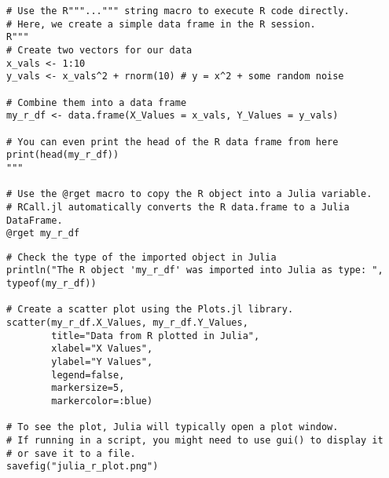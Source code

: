 \documentclass[aspectratio=169]{beamer}\usepackage[]{graphicx}\usepackage[]{xcolor}
\begin{document}
\begin{frame}[fragile]
\begin{lstlisting}
# Use the R"""...""" string macro to execute R code directly.
# Here, we create a simple data frame in the R session.
R"""
# Create two vectors for our data
x_vals <- 1:10
y_vals <- x_vals^2 + rnorm(10) # y = x^2 + some random noise

# Combine them into a data frame
my_r_df <- data.frame(X_Values = x_vals, Y_Values = y_vals)

# You can even print the head of the R data frame from here
print(head(my_r_df))
"""

# Use the @rget macro to copy the R object into a Julia variable.
# RCall.jl automatically converts the R data.frame to a Julia DataFrame.
@rget my_r_df\end{lstlisting}
\end{frame}

\begin{frame}[fragile]
\begin{lstlisting}
# Check the type of the imported object in Julia
println("The R object 'my_r_df' was imported into Julia as type: ", typeof(my_r_df))

# Create a scatter plot using the Plots.jl library.
scatter(my_r_df.X_Values, my_r_df.Y_Values,
        title="Data from R plotted in Julia",
        xlabel="X Values",
        ylabel="Y Values",
        legend=false,
        markersize=5,
        markercolor=:blue)

# To see the plot, Julia will typically open a plot window.
# If running in a script, you might need to use gui() to display it
# or save it to a file.
savefig("julia_r_plot.png")
\end{lstlisting}
\end{frame}

\end{document}
